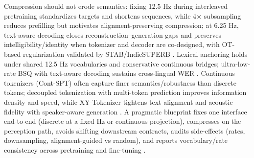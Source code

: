 \documentclass{article}
\begin{document}
Compression should not erode semantics: fixing 12.5 Hz during interleaved pretraining standardizes targets and shortens sequences, while 4$\times$ subsampling reduces prefilling but motivates alignment-preserving compression; at 6.25 Hz, text-aware decoding closes reconstruction--generation gaps and preserves intelligibility/identity when tokenizer and decoder are co-designed, with OT-based regularization validated by STAB/IndicSUPERB \cite{zeng2024scalingspeechtextpretrainingsyntheticint,wang2023slmbridgethingapbetweenspeechtextfoundat,wang2025tadicodectextawarediffusionspeechtokeniz,xu2025optimaltransportregularizationspeechtext,vashishth2024stabspeechtokenizerassessmentbenchmark,entry2025indicsuperbspeechprocessinguniversalperf}. Lexical anchoring holds under shared 12.5 Hz vocabularies and conservative continuous bridges; ultra-low-rate BSQ with text-aware decoding sustains cross-lingual WER \cite{zeng2024scalingspeechtextpretrainingsyntheticint,wang2023slmbridgethingapbetweenspeechtextfoundat,wang2025tadicodectextawarediffusionspeechtokeniz}. Continuous tokenizers (Cont-SPT) often capture finer semantics/robustness than discrete tokens; decoupled tokenization with multi-token prediction improves information density and speed, while XY-Tokenizer tightens text alignment and acoustic fidelity with speaker-aware generation \cite{li2025continuousspeechtokenizertext,gong2025xytokenizermitigatingsemanticacousticcon,fan2025whatmakesgoodspeechtokenizerllmcentricge,wang2024comparativestudydiscretespeechtokenssema}. A pragmatic blueprint fixes one interface end-to-end (discrete at a fixed Hz or continuous projection), compresses on the perception path, avoids shifting downstream contracts, audits side-effects (rates, downsampling, alignment-guided vs random), and reports vocabulary/rate consistency across pretraining and fine-tuning \cite{turetzky2024lastlanguagemodelawarespeechtokenization,li2025continuousspeechtokenizertext,verma2024whispergpthybridrepresentationaudiolarge,wang2024c3llmconditionalmultimodalcontentgenerat}.
\end{document}
